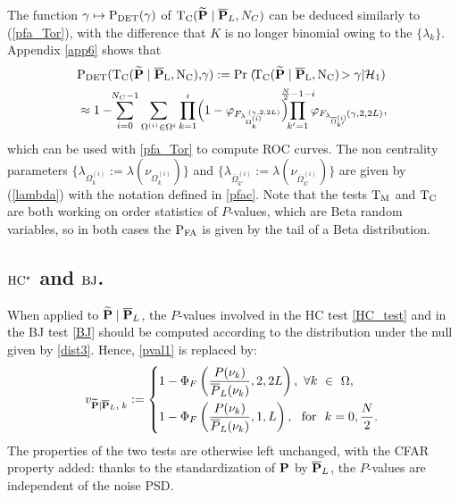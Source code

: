 \documentclass[journal]{IEEEtran}
\begin{document}
 The function $\gamma \mapsto \rm{P_{DET}} (\gamma)$ of ${\rm T_C}( {\bf \widetilde{\bf P}}\;|\;\overline{\bf P}_L,N_C)$  can be deduced similarly to (\ref{pfa_Tor}), with the difference that $K$ is no longer binomial owing to the $\{\lambda_k\}$.  Appendix \ref{app6} shows that
  \begin{equation}  
 \begin{aligned} 
 		&\rm{P_{DET}}( T_C( {\bf \widetilde{\bf P}}\;|\;\overline{\bf P}_L,N_C),\!\gamma):= \textrm{Pr}\; (\!  T_C( {\bf \widetilde{\bf P}}\;|\;\overline{\bf P}_L,N_C)\!  > \gamma | {\cal{H}}_1) \\
		&\approx 1 -\!\! \displaystyle{ \sum_{i=0}^{N_C - 1} \sum_{\Omega^{(i)} \in \Omega^i} \prod_{k=1}^{ i  } } \Big(1 - \varphi_{F_{\lambda_{\Omega^{(i)}_k}}\!^{\!\!\!\!\!\!\!\!\!(\gamma, 2,2L)}} \Big) \displaystyle{ \!\!\!\! \prod_{k'=1}^{ \frac{N}{2}-1-i }}\!\!\varphi_{F_{\lambda_{ \overline{\Omega}^{(i)}\!_{\!\!\!\!\!\!k'} }}{(\gamma, 2,2L)} },
		\label{lagrosse}
\end{aligned} 
\end{equation}	
which can be used with \eqref{pfa_Tor} to compute ROC curves. The non centrality parameters $\{\lambda_{\Omega_k^{(i)}}:= \lambda(\nu_{\Omega_k^{(i)}})\}$ and $\{\lambda_{\overline{\Omega}_{k'}^{(i)}}:= \lambda(\nu_{\overline{\Omega}_{k'}^{(i)}})\}$ are given by (\ref{lambda}) with the notation defined in \eqref{pfac}.
{ Note that the tests $\rm T_M$ and $\rm T_C$  are both working on order statistics of  $P$-values, which are Beta random variables, so in both cases the $\rm{P_{FA}}$ is given by the tail of a Beta distribution. }

\subsection{${\rm HC^\star}$ and ${\rm BJ}$.}
 \label{sec_HC}
 When applied to ${\bf \widetilde{\bf P}}\;|\;\overline{\bf P}_L$, the $P$-values involved in the HC test \eqref{HC_test} and in the BJ test 
 \eqref{BJ} should be computed according to the distribution under the null given by \eqref{dist3}. Hence,  \eqref{pval1} is replaced by:
\vspace{-0.4cm}
{
$$
\vspace{-0.2cm}
{ v_{{\bf \widetilde{\bf P}}|\overline{\bf P}_L,\;k}}  :=
  \left\{         
      \begin{aligned}
	   &1-\Phi_F\left(\frac{P(\nu_k)}{\overline{P}_L(\nu_k)}, 2, 2L\right) ,   ~ \forall k ~ \in ~ \Omega, \\
	    &1-\Phi_F\left(\frac{P(\nu_k)}{\overline{P}_L(\nu_k)}, 1, L\right),   ~ \text{ for } ~ k = 0, \frac{N}{2}.
      \end{aligned}
    \right.
$$
}
The properties of the two tests are otherwise left unchanged, with the CFAR property added:  thanks to the standardization of ${{\bf P}}$ by $\overline{\bf P}_L$, the $P$-values are
independent of the noise PSD. 
\end{document}
